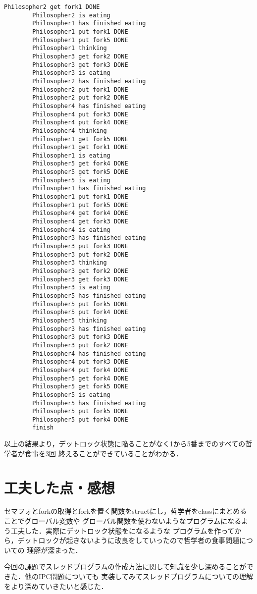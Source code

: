 \documentclass[a4paper,dvipdfmx]{jsarticle}
\begin{document}
\begin{lstlisting}[caption=実行結果,label=run_res]
        Philosopher2 get fork1 DONE 
        Philosopher2 is eating
        Philosopher1 has finished eating
        Philosopher1 put fork1 DONE 
        Philosopher1 put fork5 DONE 
        Philosopher1 thinking
        Philosopher3 get fork2 DONE 
        Philosopher3 get fork3 DONE 
        Philosopher3 is eating
        Philosopher2 has finished eating
        Philosopher2 put fork1 DONE 
        Philosopher2 put fork2 DONE 
        Philosopher4 has finished eating
        Philosopher4 put fork3 DONE 
        Philosopher4 put fork4 DONE 
        Philosopher4 thinking
        Philosopher1 get fork5 DONE 
        Philosopher1 get fork1 DONE 
        Philosopher1 is eating
        Philosopher5 get fork4 DONE 
        Philosopher5 get fork5 DONE 
        Philosopher5 is eating
        Philosopher1 has finished eating
        Philosopher1 put fork1 DONE 
        Philosopher1 put fork5 DONE 
        Philosopher4 get fork4 DONE 
        Philosopher4 get fork3 DONE 
        Philosopher4 is eating
        Philosopher3 has finished eating
        Philosopher3 put fork3 DONE 
        Philosopher3 put fork2 DONE 
        Philosopher3 thinking
        Philosopher3 get fork2 DONE 
        Philosopher3 get fork3 DONE 
        Philosopher3 is eating
        Philosopher5 has finished eating
        Philosopher5 put fork5 DONE 
        Philosopher5 put fork4 DONE 
        Philosopher5 thinking
        Philosopher3 has finished eating
        Philosopher3 put fork3 DONE 
        Philosopher3 put fork2 DONE 
        Philosopher4 has finished eating
        Philosopher4 put fork3 DONE 
        Philosopher4 put fork4 DONE 
        Philosopher5 get fork4 DONE 
        Philosopher5 get fork5 DONE 
        Philosopher5 is eating
        Philosopher5 has finished eating
        Philosopher5 put fork5 DONE 
        Philosopher5 put fork4 DONE 
        finish
    \end{lstlisting}\par
    以上の結果より，デットロック状態に陥ることがなく1から5番までのすべての哲学者が食事を3回
    終えることができていることがわかる．

\section{工夫した点・感想}
    セマフォとforkの取得とforkを置く関数をstructにし，哲学者をclassにまとめることでグローバル変数や
    グローバル関数を使わないようなプログラムになるよう工夫した．実際にデットロック状態をになるような
    プログラムを作ってから，デットロックが起きないように改良をしていったので哲学者の食事問題についての
    理解が深まった．\par
    今回の課題でスレッドプログラムの作成方法に関して知識を少し深めることができた．他のIPC問題についても
    実装してみてスレッドプログラムについての理解をより深めていきたいと感じた．
\end{document}
